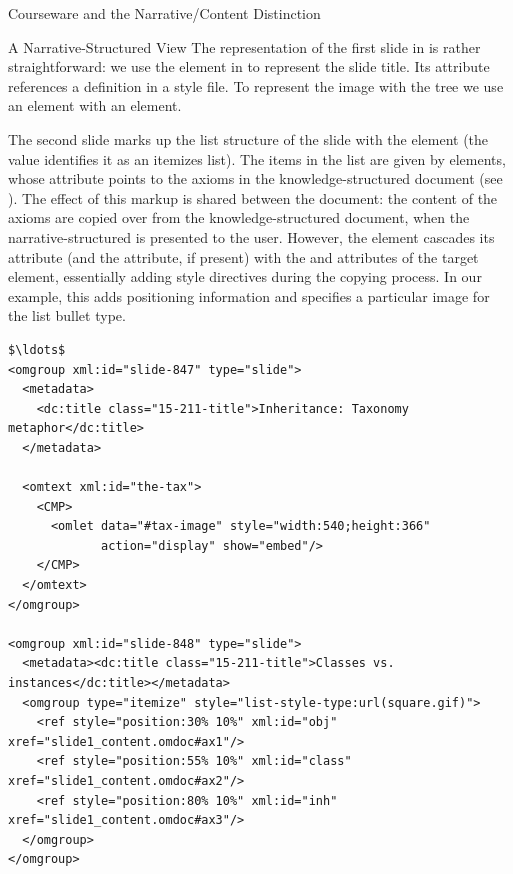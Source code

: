 \begin{tchapter}[id=courseware]{Courseware and the Narrative/Content Distinction}
\begin{tsection}[id=narrative-structured]{A Narrative-Structured View}
The representation of the first slide in {} is rather straightforward: we
use the {} element in {} to represent the slide title.
Its {} attribute references a {\css} {}
definition in a style file. To represent the image with the
{} tree we use an {} element with an {}
element.

The second slide marks up the list structure of the slide with the
{} element (the value {}
identifies it as an itemizes list). The items in the list are given by
{} elements, whose {} attribute points to the
axioms in the knowledge-structured document (see {}). The effect
of this markup is shared between the document: the content of the axioms are
copied over from the knowledge-structured document, when the narrative-structured
is presented to the user. However, the {} element cascades its
{} attribute (and the {} attribute, if
present) with the {} and {} attributes
of the target element, essentially adding style directives during the copying
process. In our example, this adds positioning information and specifies a
particular image for the list bullet type.

\begin{lstlisting}[label=lst:ann-narrative,mathescape,
    caption={The Narrative {\omdoc}  for {\myfigref{15-211}}},
    index={omgroup,omtext,CMP,metadata,dc:title,ref}]
$\ldots$
<omgroup xml:id="slide-847" type="slide">
  <metadata>
    <dc:title class="15-211-title">Inheritance: Taxonomy metaphor</dc:title>
  </metadata>
  
  <omtext xml:id="the-tax">
    <CMP>
      <omlet data="#tax-image" style="width:540;height:366" 
             action="display" show="embed"/>
    </CMP>
  </omtext>
</omgroup>

<omgroup xml:id="slide-848" type="slide">
  <metadata><dc:title class="15-211-title">Classes vs. instances</dc:title></metadata>
  <omgroup type="itemize" style="list-style-type:url(square.gif)">
    <ref style="position:30% 10%" xml:id="obj" xref="slide1_content.omdoc#ax1"/>
    <ref style="position:55% 10%" xml:id="class" xref="slide1_content.omdoc#ax2"/>
    <ref style="position:80% 10%" xml:id="inh" xref="slide1_content.omdoc#ax3"/>
  </omgroup>
</omgroup>


\end{lstlisting}
\end{tsection}
\end{tchapter}
